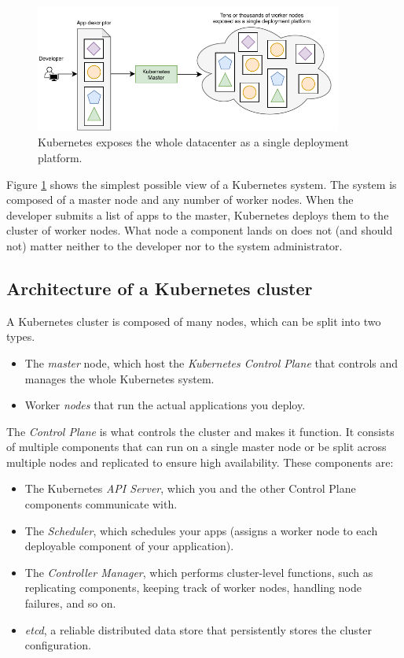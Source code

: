 \begin{figure}[tbp]
	\centering
	\includegraphics[width=0.9\textwidth]{images/kubernetesmain.pdf}
	\caption{Kubernetes exposes the whole datacenter as a single deployment platform.}
	\label{fig:kubernetesmain}
\end{figure}

Figure \ref{fig:kubernetesmain} shows the simplest possible view of a Kubernetes system. The system is composed of a master node and any number of worker nodes. When the developer submits a list of apps to the master, Kubernetes deploys them to the cluster of worker nodes. What node a component lands on does not (and should not) matter neither to the developer nor to the system administrator.

\subsection{Architecture of a Kubernetes cluster}
A Kubernetes cluster is composed of many nodes, which can be split into two types.
\begin{itemize}
	\item The \textit{master} node, which host the \textit{Kubernetes Control Plane} that controls and manages the whole Kubernetes system.
	\item Worker \textit{nodes} that run the actual applications you deploy.
\end{itemize}

The \textit{Control Plane} is what controls the cluster and makes it function.
It consists of multiple components that can run on a single master node or be split across multiple nodes and replicated to ensure high availability. These components are:
\begin{itemize}
	\item The Kubernetes \textit{API Server}, which you and the other Control Plane components communicate with.
	\item The \textit{Scheduler}, which schedules your apps (assigns a worker node to each deployable component of your application).
	\item The \textit{Controller Manager}, which performs cluster-level functions, such as replicating components, keeping track of worker nodes, handling node failures, and so on.
	\item \textit{etcd}, a reliable distributed data store that persistently stores the cluster configuration. 
\end{itemize}

